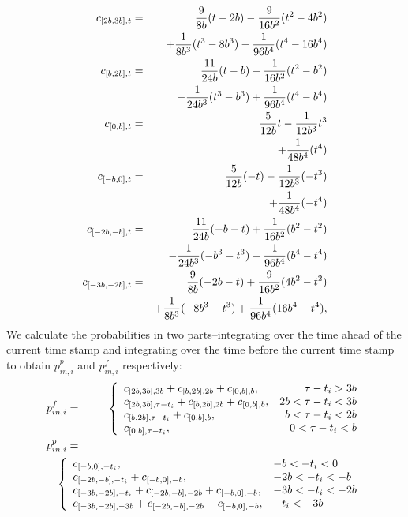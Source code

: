 \begin{eqnarray}
c_{[2b, 3b],t} &=&      {9 \over 8 b}(t-2b)-{9 \over 16 b^2}(t^2-4b^2)\nonumber\\
&&+{1\over8 b^3}(t^3-8b^3)-{1\over 96b^4}(t^4-16b^4)\label{eqn:cdfcomp}\\
c_{[b,2b],t} &=&      {11\over 24b}(t-b)-{1\over 16b^2}(t^2-b^2)\nonumber\\
&&-{1\over 24b^3}(t^3-b^3)+{1\over 96b^4}(t^4-b^4)\nonumber\\
c_{[0,b],t} &=& {5\over 12b}t-{1\over 12b^3}t^3\nonumber\\
&&+{1\over 48 b^4}(t^4)\nonumber \\
c_{[-b,0],t} &=& {5\over 12b}(-t)-{1\over 12b^3}(-t^3)\nonumber\\
&&+{1\over 48 b^4}(-t^4)\nonumber \\
c_{[-2b,-b],t} &=&      {11\over 24b}(-b-t)+{1\over 16b^2}(b^2-t^2)\nonumber\\
&&-{1\over 24b^3}(-b^3-t^3)-{1\over 96b^4}(b^4-t^4)\nonumber\\
c_{[-3b, -2b],t} &=&      {9 \over 8 b}(-2b-t)+{9 \over 16 b^2}(4b^2-t^2)\nonumber\\
&&+{1\over8 b^3}(-8b^3-t^3)+{1\over 96b^4}(16b^4-t^4)\nonumber,
\end{eqnarray}
We calculate the probabilities in two parts--integrating over the time ahead of the current time stamp and integrating over the time before the current time stamp to obtain $p_{in,i}^p$ and $p_{in,i}^f$ respectively:
\begin{eqnarray}
p_{in,i}^f&=&\left\{\begin{array}{lr}
    c_{[2b,3b],3b}+c_{[b,2b],2b}+c_{[0,b],b}, & \tau-t_i>3b\\
    c_{[2b,3b],\tau-t_i}+c_{[b,2b],2b}+c_{[0,b],b}, & 2b<\tau-t_i<3b\\
    c_{[b,2b],\tau-t_i}+c_{[0,b],b}, & b<\tau-t_i<2b\\
    c_{[0,b],\tau-t_i}, & 0<\tau-t_i<b
    \end{array} \right.\label{eqn:pinlongf}\\
p_{in,i}^p&=&\nonumber\\
&&\hspace{-0.4in}\left\{\begin{array}{ll}
    c_{[-b,0],-t_i}, & -b<-t_i<0\\
    c_{[-2b,-b],-t_i}+c_{[-b,0],-b}, & -2b<-t_i<-b\\
    c_{[-3b, -2b],-t_i}+c_{[-2b,-b],-2b}+c_{[-b,0],-b}, & -3b<-t_i<-2b\\
    c_{[-3b, -2b],-3b}+c_{[-2b,-b],-2b}+c_{[-b,0],-b}, &-t_i<-3b
    \end{array} \right.\label{eqn:pinlongp}
\end{eqnarray}
